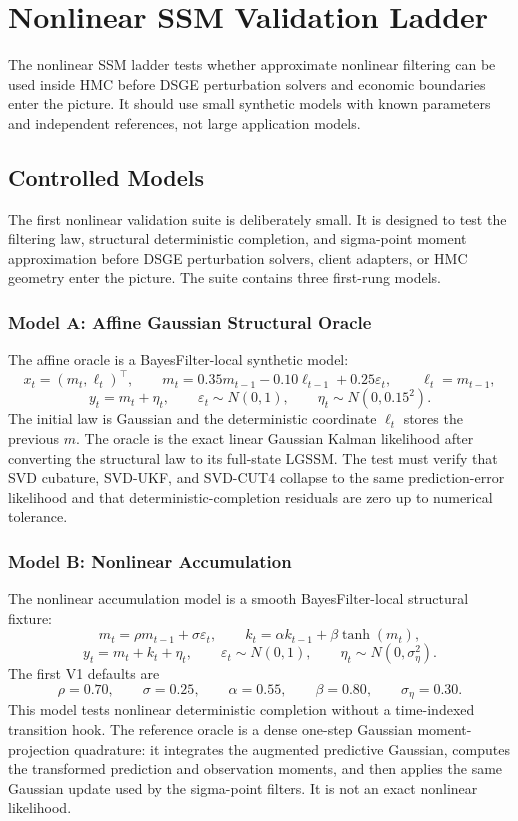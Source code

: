 \chapter{Nonlinear SSM Validation Ladder}
\label{ch:bf-nonlinear-ssm-validation}

The nonlinear SSM ladder tests whether approximate nonlinear filtering can be
used inside HMC before DSGE perturbation solvers and economic boundaries enter
the picture.  It should use small synthetic models with known parameters and
independent references, not large application models.

\section{Controlled Models}
\label{sec:bf-nonlinear-controlled-models}

The first nonlinear validation suite is deliberately small.  It is designed to
test the filtering law, structural deterministic completion, and sigma-point
moment approximation before DSGE perturbation solvers, client adapters, or HMC
geometry enter the picture.  The suite contains three first-rung models.

\subsection{Model A: Affine Gaussian Structural Oracle}
\label{subsec:bf-nonlinear-model-a}

The affine oracle is a BayesFilter-local synthetic model:
\[
  x_t=(m_t,\ell_t)^\top,\qquad
  m_t=0.35m_{t-1}-0.10\ell_{t-1}+0.25\varepsilon_t,\qquad
  \ell_t=m_{t-1},
\]
\[
  y_t=m_t+\eta_t,\qquad
  \varepsilon_t\sim N(0,1),\qquad
  \eta_t\sim N(0,0.15^2).
\]
The initial law is Gaussian and the deterministic coordinate \(\ell_t\)
stores the previous \(m\).  The oracle is the exact linear Gaussian Kalman
likelihood after converting the structural law to its full-state LGSSM.  The
test must verify that SVD cubature, SVD-UKF, and SVD-CUT4 collapse to the same
prediction-error likelihood and that deterministic-completion residuals are
zero up to numerical tolerance.

\subsection{Model B: Nonlinear Accumulation}
\label{subsec:bf-nonlinear-model-b}

The nonlinear accumulation model is a smooth BayesFilter-local structural
fixture:
\[
  m_t=\rho m_{t-1}+\sigma\varepsilon_t,\qquad
  k_t=\alpha k_{t-1}+\beta\tanh(m_t),
\]
\[
  y_t=m_t+k_t+\eta_t,\qquad
  \varepsilon_t\sim N(0,1),\qquad
  \eta_t\sim N(0,\sigma_\eta^2).
\]
The first V1 defaults are
\[
  \rho=0.70,\qquad \sigma=0.25,\qquad \alpha=0.55,\qquad
  \beta=0.80,\qquad \sigma_\eta=0.30.
\]
This model tests nonlinear deterministic completion without a time-indexed
transition hook.  The reference oracle is a dense one-step Gaussian
moment-projection quadrature: it integrates the augmented predictive Gaussian,
computes the transformed prediction and observation moments, and then applies
the same Gaussian update used by the sigma-point filters.  It is not an exact
nonlinear likelihood.

